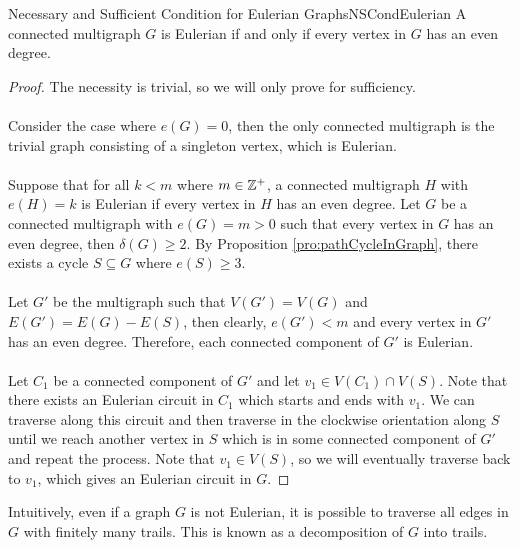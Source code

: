 \documentclass[math]{amznotes}
\theoremstyle{remark}
\newcommand{\0}{\mathbf{0}}
\newcommand{\1}{\mathbf{1}}
\begin{document}
\begin{thmbox}{Necessary and Sufficient Condition for Eulerian Graphs}{NSCondEulerian}
    A connected multigraph $G$ is Eulerian if and only if every vertex in $G$ has an even degree.
    \tcblower
    \begin{proof}
        The necessity is trivial, so we will only prove for sufficiency.
        \\\\
        Consider the case where $e(G) = 0$, then the only connected multigraph is the trivial graph consisting of a singleton vertex, which is Eulerian. 
        \\\\
        Suppose that for all $k < m$ where $m \in \mathbb{Z}^+$, a connected multigraph $H$ with $e(H) = k$ is Eulerian if every vertex in $H$ has an even degree. Let $G$ be a connected multigraph with $e(G) = m > 0$ such that every vertex in $G$ has an even degree, then $\delta(G) \geq 2$. By Proposition \ref{pro:pathCycleInGraph}, there exists a cycle $S \subseteq G$ where $e(S) \geq 3$.
        \\\\
        Let $G'$ be the multigraph such that $V(G') = V(G)$ and $E(G') = E(G) - E(S)$, then clearly, $e(G') < m$ and every vertex in $G'$ has an even degree. Therefore, each connected component of $G'$ is Eulerian.
        \\\\
        Let $C_1$ be a connected component of $G'$ and let $v_1 \in V(C_1) \cap V(S)$. Note that there exists an Eulerian circuit in $C_1$ which starts and ends with $v_1$. We can traverse along this circuit and then traverse in the clockwise orientation along $S$ until we reach another vertex in $S$ which is in some connected component of $G'$ and repeat the process. Note that $v_1 \in V(S)$, so we will eventually traverse back to $v_1$, which gives an Eulerian circuit in $G$.
    \end{proof}
\end{thmbox}
Intuitively, even if a graph $G$ is not Eulerian, it is possible to traverse all edges in $G$ with finitely many trails. This is known as a decomposition of $G$ into trails.
\end{document}
